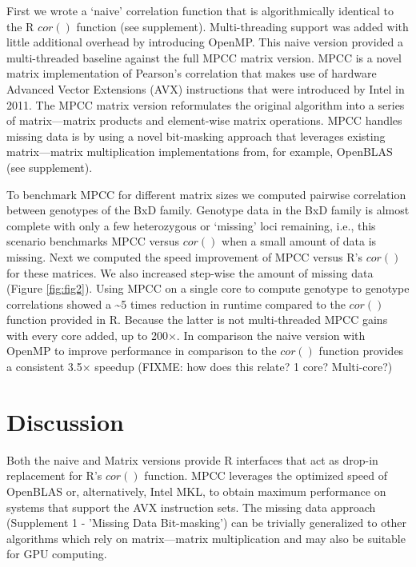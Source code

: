 \documentclass{bioinfo}
\begin{document}
First we wrote a `naive' correlation function that is algorithmically
identical to the R $cor()$ function (see supplement). Multi-threading
support was added with little additional overhead by introducing
OpenMP. This naive version provided a multi-threaded baseline against
the full MPCC matrix version.  MPCC is a novel matrix implementation
of Pearson's correlation that makes use of hardware Advanced Vector
Extensions (AVX) instructions that were introduced by Intel in 2011.
The MPCC matrix version reformulates the original algorithm into a
series of matrix---matrix products and element-wise matrix
operations. MPCC handles missing data is by using a novel bit-masking
approach that leverages existing matrix---matrix multiplication
implementations from, for example, OpenBLAS (see supplement).

To benchmark MPCC for different matrix sizes we computed pairwise
correlation between genotypes of the BxD family.  Genotype data in the
BxD family is almost complete with only a few heterozygous or
`missing' loci remaining, i.e., this scenario benchmarks MPCC versus
$cor()$ when a small amount of data is missing.  Next we computed the
speed improvement of MPCC versus R's $cor()$ for these matrices. We
also increased step-wise the amount of missing data
(Figure \ref{fig:fig2}). Using MPCC on a single core to compute
genotype to genotype correlations showed a \textasciitilde{}5 times
reduction in runtime compared to the $cor()$ function provided in R.
Because the latter is not multi-threaded MPCC gains with every core
added, up to 200$\times$.  In comparison the naive version with OpenMP
to improve performance in comparison to the $cor()$ function provides
a consistent 3.5$\times$ speedup (FIXME: how does this relate? 1 core? Multi-core?)

\section{Discussion}

Both the naive and Matrix versions provide R interfaces that act as
drop-in replacement for R's $cor()$ function.  MPCC leverages the
optimized speed of OpenBLAS or, alternatively, Intel\textregistered{}
MKL, to obtain maximum performance on systems that support the
AVX instruction sets.  The missing data
approach (Supplement 1 - 'Missing Data Bit-masking') can be trivially
generalized to other algorithms which rely on matrix---matrix
multiplication and may also be suitable for GPU computing.
\end{document}
